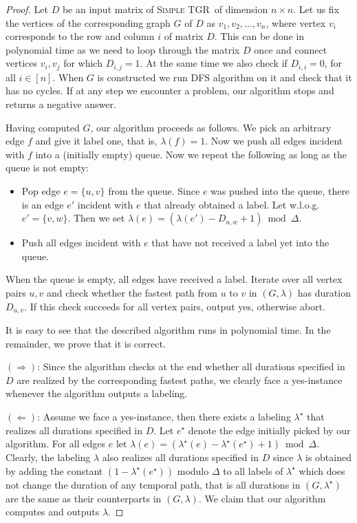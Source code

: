 \documentclass[a4paper,UKenglish,cleveref, autoref, thm-restate]{lipics-v2021}
\newcommand{\deltaExact}{\textsc{Simple TGR}}
\begin{document}
\begin{proof}
    Let $D$ be an input matrix of \deltaExact\ of dimension $n \times n$.
    Let us fix the vertices of the corresponding graph $G$ of $D$ as $v_1, v_2, \dots, v_n$, where vertex $v_i$ corresponds to the row and column $i$ of matrix $D$.
    This can be done in polynomial time as we need to loop through the matrix $D$ once and connect vertices $v_i, v_j$ for which $D_{i,j} = 1$. At the same time we also check if $D_{i,i} = 0$, for all $i \in [n]$.
    When $G$ is constructed we run DFS algorithm on it and check that it has no cycles.
    If at any step we encounter a problem, our algorithm stops and returns a negative answer.

    Having computed $G$, our algorithm proceeds as follows. We pick an arbitrary edge $f$ and give it label one, that is, $\lambda(f)=1$. Now we push all edges incident with $f$ into a (initially empty) queue. Now we repeat the following as long as the queue is not empty:
\begin{itemize}
    \item Pop edge $e=\{u,v\}$ from the queue. Since $e$ was pushed into the queue, there is an edge $e'$ incident with $e$ that already obtained a label. Let w.l.o.g.\ $e'=\{v,w\}$. Then we set $\lambda(e)=(\lambda(e')-D_{u,w}+1)\bmod \Delta$.
    \item Push all edges incident with $e$ that have not received a label yet into the queue.
\end{itemize}
When the queue is empty, all edges have received a label. Iterate over all vertex pairs $u,v$ and check whether the fastest path from $u$ to $v$ in $(G,\lambda)$ has duration $D_{u,v}$. If this check succeeds for all vertex pairs, output yes, otherwise abort.

It is easy to see that the described algorithm runs in polynomial time. In the remainder, we prove that it is correct.

$(\Rightarrow)$: Since the algorithm checks at the end whether all durations specified in $D$ are realized by the corresponding fastest paths, we clearly face a yes-instance whenever the algorithm outputs a labeling.

$(\Leftarrow)$: Assume we face a yes-instance, then there exists a labeling $\lambda^\star$ that realizes all durations specified in $D$. Let $e^\star$ denote the edge initially picked by our algorithm. For all edges $e$ let $\lambda(e)=(\lambda^\star(e)-\lambda^\star(e^\star)+1)\bmod \Delta$. Clearly, the labeling $\lambda$ also realizes all durations specified in $D$ since $\lambda$ is obtained by adding the constant $(1-\lambda^\star(e^\star))$ modulo $\Delta$ to all labels of $\lambda^\star$ which does not change the duration of any temporal path, that is all durations in $(G,\lambda^\star)$ are the same as their counterparts in $(G,\lambda)$. We claim that our algorithm computes and outputs $\lambda$.


\end{proof}
\end{document}
